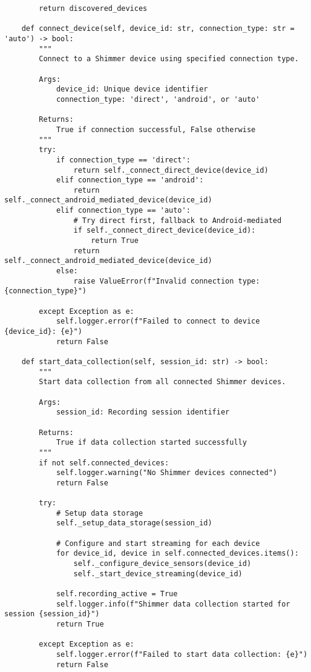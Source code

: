 \documentclass[11pt,a4paper]{article}
\begin{document}
\begin{verbatim}
        return discovered_devices

    def connect_device(self, device_id: str, connection_type: str = 'auto') -> bool:
        """
        Connect to a Shimmer device using specified connection type.

        Args:
            device_id: Unique device identifier
            connection_type: 'direct', 'android', or 'auto'

        Returns:
            True if connection successful, False otherwise
        """
        try:
            if connection_type == 'direct':
                return self._connect_direct_device(device_id)
            elif connection_type == 'android':
                return self._connect_android_mediated_device(device_id)
            elif connection_type == 'auto':
                # Try direct first, fallback to Android-mediated
                if self._connect_direct_device(device_id):
                    return True
                return self._connect_android_mediated_device(device_id)
            else:
                raise ValueError(f"Invalid connection type: {connection_type}")

        except Exception as e:
            self.logger.error(f"Failed to connect to device {device_id}: {e}")
            return False

    def start_data_collection(self, session_id: str) -> bool:
        """
        Start data collection from all connected Shimmer devices.

        Args:
            session_id: Recording session identifier

        Returns:
            True if data collection started successfully
        """
        if not self.connected_devices:
            self.logger.warning("No Shimmer devices connected")
            return False

        try:
            # Setup data storage
            self._setup_data_storage(session_id)

            # Configure and start streaming for each device
            for device_id, device in self.connected_devices.items():
                self._configure_device_sensors(device_id)
                self._start_device_streaming(device_id)

            self.recording_active = True
            self.logger.info(f"Shimmer data collection started for session {session_id}")
            return True

        except Exception as e:
            self.logger.error(f"Failed to start data collection: {e}")
            return False


\end{verbatim}
\end{document}
